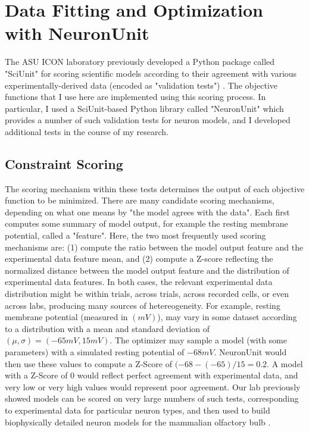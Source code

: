 \section{Data Fitting and Optimization with NeuronUnit}
The ASU ICON laboratory previously developed a Python package called "SciUnit" for scoring scientific models according to their agreement with various experimentally-derived data (encoded as "validation tests") \cite{omar2014collaborative}.  The objective functions that I use here are implemented using this scoring process.
In particular, I used a SciUnit-based Python library called "NeuronUnit" which provides a number of such validation tests for neuron models, and I developed additional tests in the course of my research.

\subsection{Constraint Scoring}
The scoring mechanism within these tests determines the output of each objective function to be minimized.  There are many candidate scoring mechanisms, depending on what one means by "the model agrees with the data".  Each first computes some summary of model output, for example the resting membrane potential, called a "feature".
Here, the two most frequently used scoring mechanisms are: (1) compute the ratio between the model output feature and the experimental data feature mean, and (2) compute a Z-score reflecting the normalized distance between the model output feature and the distribution of experimental data features.
In both cases, the relevant experimental data distribution might be within trials, across trials, across recorded cells, or even across labs, producing many sources of hetereogeneity.
For example, resting membrane potential (measured in $(mV)$), may vary in some dataset according to a distribution with a mean and standard deviation of $(\mu,\sigma)=(-65mV,15mV)$.
The optimizer may sample a model (with some parameters) with a simulated resting potential of $-68mV$.  
NeuronUnit would then use these values to compute a Z-Score of $(-68 - (-65)/15 = 0.2$.
A model with a Z-Score of 0 would reflect perfect agreement with experimental data, and very low or very high values would represent poor agreement.
Our lab previously showed models can be scored on very large numbers of such tests, corresponding to experimental data for particular neuron types, and then used to build biophysically detailed neuron models for the mammalian olfactory bulb \cite{birgiolas2019towards}.

